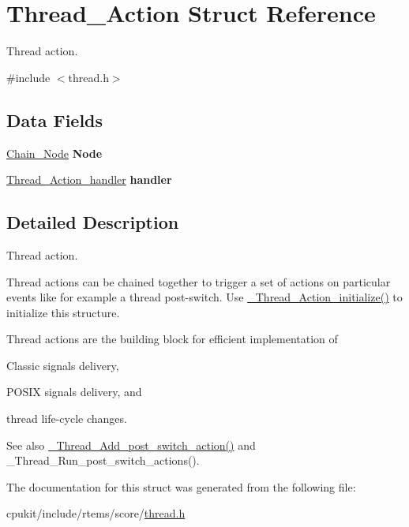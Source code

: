 \hypertarget{structThread__Action}{}\section{Thread\+\_\+\+Action Struct Reference}
\label{structThread__Action}


Thread action.  




{\ttfamily \#include $<$thread.\+h$>$}

\subsection*{Data Fields}
\begin{DoxyCompactItemize}
\item 
\mbox{\label{structThread__Action_aa9f7615114e0c5f2cf4aacc2791f9a20}} 
\mbox{\hyperlink{group__RTEMSScoreChain_ga0dd4bfcca1ac7f90de2842e447846d3d}{Chain\+\_\+\+Node}} {\bfseries Node}
\item 
\mbox{\label{structThread__Action_a1e2b4a8fbfd859a4a8641a785ae8af6b}} 
\mbox{\hyperlink{group__RTEMSScoreThread_ga3ed91c6271fd8090120d824662541c74}{Thread\+\_\+\+Action\+\_\+handler}} {\bfseries handler}
\end{DoxyCompactItemize}


\subsection{Detailed Description}
Thread action. 

Thread actions can be chained together to trigger a set of actions on particular events like for example a thread post-\/switch. Use \mbox{\hyperlink{group__RTEMSScoreThread_gaaae54223afb793365b74ff959e0d2369}{\+\_\+\+Thread\+\_\+\+Action\+\_\+initialize()}} to initialize this structure.

Thread actions are the building block for efficient implementation of
\begin{DoxyItemize}
\item Classic signals delivery,
\item P\+O\+S\+IX signals delivery, and
\item thread life-\/cycle changes.
\end{DoxyItemize}

\begin{DoxySeeAlso}{See also}
\mbox{\hyperlink{group__RTEMSScoreThread_gab19f3f385804128f7f975c8ed326765a}{\+\_\+\+Thread\+\_\+\+Add\+\_\+post\+\_\+switch\+\_\+action()}} and \+\_\+\+Thread\+\_\+\+Run\+\_\+post\+\_\+switch\+\_\+actions(). 
\end{DoxySeeAlso}


The documentation for this struct was generated from the following file\+:\begin{DoxyCompactItemize}
\item 
cpukit/include/rtems/score/\mbox{\hyperlink{score_2thread_8h}{thread.\+h}}\end{DoxyCompactItemize}
